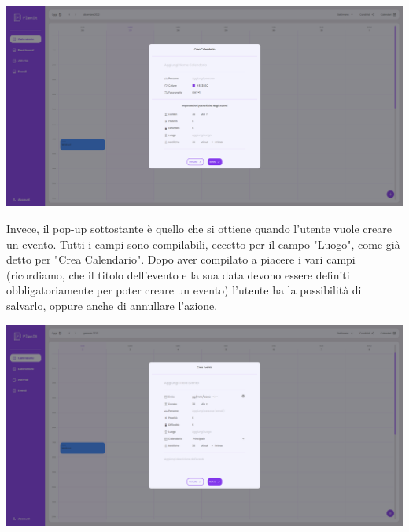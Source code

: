 \begin{center}
    \includegraphics[width=1\textwidth, height=0.32\textheight]{img/png/FrontEnd/Calendario/calendario_creaCalendario.png}
\end{center}

Invece, il pop-up sottostante è quello che si ottiene quando l'utente vuole creare un evento. Tutti i campi sono compilabili, eccetto per il campo "Luogo", come già detto per "Crea Calendario". Dopo aver compilato a piacere i vari campi (ricordiamo, che il titolo dell'evento e la sua data devono essere definiti obbligatoriamente per poter creare un evento) l'utente ha la possibilità di salvarlo, oppure anche di annullare l'azione.

\begin{center}
    \includegraphics[width=1\textwidth, height=0.32\textheight]{img/png/FrontEnd/Calendario/calendario_creaEvento.png}
\end{center}

